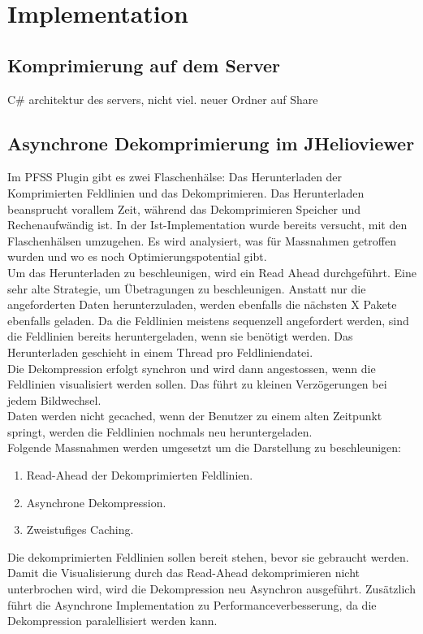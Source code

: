 \section{Implementation}

\subsection{Komprimierung auf dem Server}
C\# architektur des servers, nicht viel.
neuer Ordner auf Share


\subsection{Asynchrone Dekomprimierung im JHelioviewer}
Im PFSS Plugin gibt es zwei Flaschenhälse: Das Herunterladen der Komprimierten Feldlinien und das Dekomprimieren. Das Herunterladen beansprucht vorallem Zeit, während das Dekomprimieren Speicher und Rechenaufwändig ist. In der Ist-Implementation wurde bereits versucht, mit den Flaschenhälsen umzugehen. Es wird analysiert, was für Massnahmen getroffen wurden und wo es noch Optimierungspotential gibt.\\
[\baselineskip]
Um das Herunterladen zu beschleunigen, wird ein Read Ahead durchgeführt. Eine sehr alte Strategie, um Übetragungen zu beschleunigen. Anstatt nur die angeforderten Daten herunterzuladen, werden ebenfalls die nächsten X Pakete ebenfalls geladen. Da die Feldlinien meistens sequenzell angefordert werden, sind die Feldlinien bereits heruntergeladen, wenn sie benötigt werden. Das Herunterladen geschieht in einem Thread pro Feldliniendatei.\\
Die Dekompression erfolgt synchron und wird dann angestossen, wenn die Feldlinien visualisiert werden sollen. Das führt zu kleinen Verzögerungen bei jedem Bildwechsel.\\
Daten werden nicht gecached, wenn der Benutzer zu einem alten Zeitpunkt springt, werden die Feldlinien nochmals neu heruntergeladen.\\
[\baselineksip]
Folgende Massnahmen werden umgesetzt um die Darstellung zu beschleunigen:
\begin{enumerate}
	\item Read-Ahead der Dekomprimierten Feldlinien.
	\item Asynchrone Dekompression.
	\item Zweistufiges Caching.
\end{enumerate}
Die dekomprimierten Feldlinien sollen bereit stehen, bevor sie gebraucht werden.\\ Damit die Visualisierung durch das Read-Ahead dekomprimieren nicht unterbrochen wird, wird die Dekompression neu Asynchron ausgeführt. Zusätzlich führt die Asynchrone Implementation zu Performanceverbesserung, da die Dekompression paralellisiert werden kann.\\
